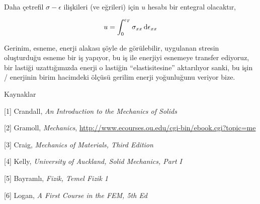 \documentclass[12pt,fleqn]{article}\usepackage{../../common}
\begin{document}
Daha çetrefil $\sigma-\epsilon$ ilişkileri (ve eğrileri) için $u$ hesabı
bir entegral olacaktır,

$$
u = \int_{0}^{\epsilon_{T}} \sigma_{xx} \,\mathrm{d} \epsilon_{xx} 
$$

Gerinim, esneme, enerji alakası şöyle de görülebilir, uygulanan stresin
oluşturduğu esneme bir iş yapıyor, bu iş ile enerjiyi esnemeye transfer
ediyoruz, bir lastiği uzattığımızda enerji o lastiğin ``elastisitesine''
aktarılıyor sanki, bu işin / enerjinin birim hacimdeki ölçüsü gerilim
enerji yoğunluğunu veriyor bize.

Kaynaklar

[1] Crandall, {\em An Introduction to the Mechanics of Solids}

[2] Gramoll, {\em Mechanics},
    \url{http://www.ecourses.ou.edu/cgi-bin/ebook.cgi?topic=me}

[3] Craig, {\em Mechanics of Materials, Third Edition}

[4] Kelly, {\em University of Auckland, Solid Mechanics, Part I}

[5] Bayramlı, {\em Fizik, Temel Fizik 1}

[6] Logan, {\em A First Course in the FEM, 5th Ed}
\end{document}
